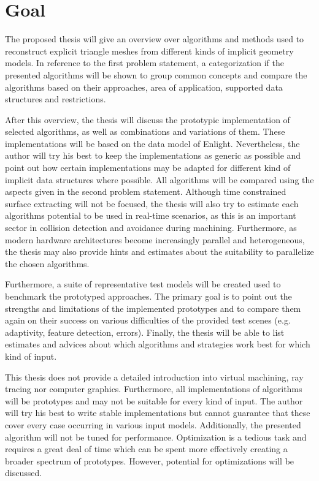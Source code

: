 
\section{Goal}

The proposed thesis will give an overview over algorithms and methods used to reconstruct explicit triangle meshes from different kinds of implicit geometry models. In reference to the first problem statement, a categorization if the presented algorithms will be shown to group common concepts and compare the algorithms based on their approaches, area of application, supported data structures and restrictions.

After this overview, the thesis will discuss the prototypic implementation of selected algorithms, as well as combinations and variations of them. These implementations will be based on the data model of Enlight. Nevertheless, the author will try his best to keep the implementations as generic as possible and point out how certain implementations may be adapted for different kind of implicit data structures where possible. All algorithms will be compared using the aspects given in the second problem statement. Although time constrained surface extracting will not be focused, the thesis will also try to estimate each algorithms potential to be used in real-time scenarios, as this is an important sector in collision detection and avoidance during machining. Furthermore, as modern hardware architectures become increasingly parallel and heterogeneous, the thesis may also provide hints and estimates about the suitability to parallelize the chosen algorithms.

Furthermore, a suite of representative test models will be created used to benchmark the prototyped approaches. The primary goal is to point out the strengths and limitations of the implemented prototypes and to compare them again on their success on various difficulties of the provided test scenes (e.g. adaptivity, feature detection, errors). Finally, the thesis will be able to list estimates and advices about which algorithms and strategies work best for which kind of input.

This thesis does not provide a detailed introduction into virtual machining, ray tracing nor computer graphics. Furthermore, all implementations of algorithms will be prototypes and may not be suitable for every kind of input. The author will try his best to write stable implementations but cannot guarantee that these cover every case occurring in various input models. Additionally, the presented algorithm will not be tuned for performance. Optimization is a tedious task and requires a great deal of time which can be spent more effectively creating a broader spectrum of prototypes. However, potential for optimizations will be discussed.
